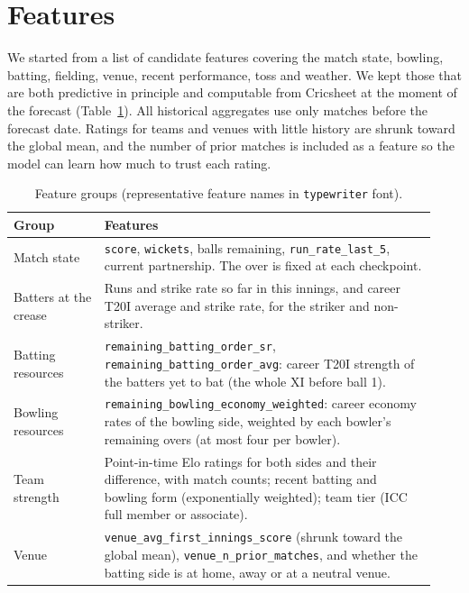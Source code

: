 \documentclass{article}
\newcommand{\1}{\mathbf{1}}
\begin{document}
\section{Features}\label{sec:features}
We started from a list of candidate features covering the match state, bowling, batting, fielding, venue, recent performance, toss and weather. We kept those that are both predictive in principle and computable from Cricsheet at the moment of the forecast (Table~\ref{tab:features}). All historical aggregates use only matches before the forecast date. Ratings for teams and venues with little history are shrunk toward the global mean, and the number of prior matches is included as a feature so the model can learn how much to trust each rating.

\begin{table}[h]
\centering
\caption{Feature groups (representative feature names in \texttt{typewriter} font).}
\label{tab:features}
\small
\begin{tabular}{>{\raggedright\arraybackslash}p{0.2\linewidth}>{\raggedright\arraybackslash}p{0.73\linewidth}}
\toprule
Group & Features \\
\midrule
Match state & \texttt{score}, \texttt{wickets}, balls remaining, \texttt{run\_rate\_last\_5}, current partnership. The over is fixed at each checkpoint. \\
Batters at the crease & Runs and strike rate so far in this innings, and career T20I average and strike rate, for the striker and non-striker. \\
Batting resources & \texttt{remaining\_batting\_order\_sr}, \texttt{remaining\_batting\_order\_avg}: career T20I strength of the batters yet to bat (the whole XI before ball 1). \\
Bowling resources & \texttt{remaining\_bowling\_economy\_weighted}: career economy rates of the bowling side, weighted by each bowler's remaining overs (at most four per bowler). \\
Team strength & Point-in-time Elo ratings \citep{elo1978} for both sides and their difference, with match counts; recent batting and bowling form (exponentially weighted); team tier (ICC full member or associate). \\
Venue & \texttt{venue\_avg\_first\_innings\_score} (shrunk toward the global mean), \texttt{venue\_n\_prior\_matches}, and whether the batting side is at home, away or at a neutral venue. \\
\bottomrule
\end{tabular}
\end{table}
\end{document}
